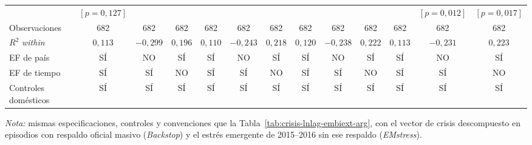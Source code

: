 \begin{landscape}
\begin{table}
\begin{adjustbox}{max width=\linewidth, max totalheight=\tablaalto\textheight}
\begin{tabular}{l c ccc ccc ccc cc}
 & $[p=0{,}127]$ &  &  &  &  &  &  &  &  &  & $[p=0{,}012]$ & $[p=0{,}017]$ \\
\addlinespace
Observaciones & 682 & 682 & 682 & 682 & 682 & 682 & 682 & 682 & 682 & 682 & 682 & 682 \\
$R^2$ \textit{within} & $0{,}113$ & $-0{,}299$ & $0{,}196$ & $0{,}110$ & $-0{,}243$ & $0{,}218$ & $0{,}120$ & $-0{,}238$ & $0{,}222$ & $0{,}113$ & $-0{,}231$ & $0{,}223$ \\
\midrule
EF de país & SÍ & NO & SÍ & SÍ & NO & SÍ & SÍ & NO & SÍ & SÍ & NO & SÍ \\
EF de tiempo & SÍ & SÍ & NO & SÍ & SÍ & NO & SÍ & SÍ & NO & SÍ & SÍ & NO \\
Controles domésticos & SÍ & SÍ & SÍ & SÍ & SÍ & SÍ & SÍ & SÍ & SÍ & SÍ & SÍ & SÍ \\
\bottomrule
\end{tabular}
\end{adjustbox}
\par\smallskip\parbox{\linewidth}{\scriptsize \textit{Nota:} mismas especificaciones, controles y convenciones que la Tabla~\ref{tab:crisis-lnlag-embiext-arg}, con el vector de crisis descompuesto en episodios con respaldo oficial masivo (\textit{Backstop}) y el estrés emergente de 2015--2016 sin ese respaldo (\textit{EMstress}).}
\end{table}
\end{landscape}
